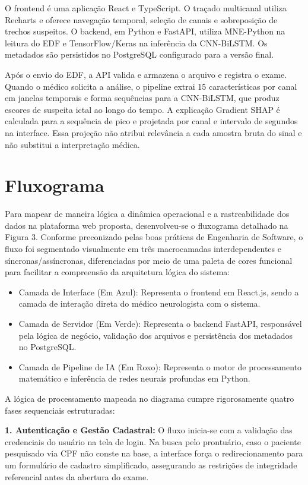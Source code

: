 O frontend é uma aplicação React e TypeScript. O traçado multicanal utiliza Recharts e oferece navegação temporal, seleção de canais e sobreposição de trechos suspeitos. O backend, em Python e FastAPI, utiliza MNE-Python na leitura do EDF e TensorFlow/Keras na inferência da CNN-BiLSTM. Os metadados são persistidos no PostgreSQL configurado para a versão final.

Após o envio do EDF, a API valida e armazena o arquivo e registra o exame. Quando o médico solicita a análise, o pipeline extrai 15 características por canal em janelas temporais e forma sequências para a CNN-BiLSTM, que produz escores de suspeita ictal ao longo do tempo. A explicação Gradient SHAP é calculada para a sequência de pico e projetada por canal e intervalo de segundos na interface. Essa projeção não atribui relevância a cada amostra bruta do sinal e não substitui a interpretação médica.

\section{Fluxograma}
Para mapear de maneira lógica a dinâmica operacional e a rastreabilidade dos dados na plataforma web proposta, desenvolveu-se o fluxograma detalhado na Figura 3. Conforme preconizado pelas boas práticas de Engenharia de Software, o fluxo foi segmentado visualmente em três macrocamadas interdependentes e síncronas/assíncronas, diferenciadas por meio de uma paleta de cores funcional para facilitar a compreensão da arquitetura lógica do sistema:

\begin{itemize}[leftmargin=1.25cm,itemsep=0pt,topsep=0pt]
\item Camada de Interface (Em Azul): Representa o frontend em React.js, sendo a camada de interação direta do médico neurologista com o sistema.
\item Camada de Servidor (Em Verde): Representa o backend FastAPI, responsável pela lógica de negócio, validação dos arquivos e persistência dos metadados no PostgreSQL.
\item Camada de Pipeline de IA (Em Roxo): Representa o motor de processamento matemático e inferência de redes neurais profundas em Python.
\end{itemize}
A lógica de processamento mapeada no diagrama cumpre rigorosamente quatro fases sequenciais estruturadas:

\textbf{1. Autenticação e Gestão Cadastral: }O fluxo inicia-se com a validação das credenciais do usuário na tela de login. Na busca pelo prontuário, caso o paciente pesquisado via CPF não conste na base, a interface força o redirecionamento para um formulário de cadastro simplificado, assegurando as restrições de integridade referencial antes da abertura do exame.

